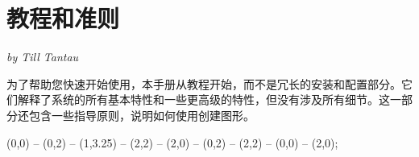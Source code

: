 

\part{教程和准则}

{\Large \emph{by Till Tantau}}

\bigskip


为了帮助您快速开始使用\tikzname ，本手册从教程开始，而不是冗长的安装和配置部分。它们解释了系统的所有基本特性和一些更高级的特性，但没有涉及所有细节。这一部分还包含一些指导原则，说明如何使用\tikzname 创建图形。

\vskip3cm

\begin{codeexample}[graphic=white,width=0pt]
\tikz \draw[thick,rounded corners=8pt]
  (0,0) -- (0,2) -- (1,3.25) -- (2,2) -- (2,0) -- (0,2) -- (2,2) -- (0,0) -- (2,0);
\end{codeexample}

\clearpage






